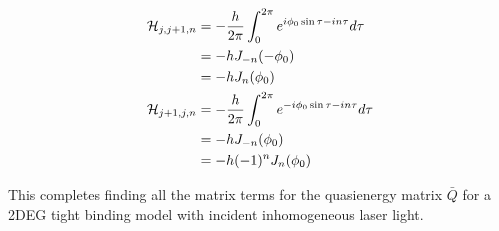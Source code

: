 \begin{align}
  \mathcal{H}_{j,j+1,n} &= -\dfrac{h}{2\pi} \int_0^{2\pi} e^{i \phi_0 \sin \tau - in\tau} d\tau \nonumber \\
  &= -h J_{-n}(-\phi_0) \nonumber \\
  &= -h J_n(\phi_0) \\
  \mathcal{H}_{j+1,j,n} &= -\dfrac{h}{2\pi} \int_0^{2\pi} e^{-i \phi_0 \sin \tau - in\tau} d\tau \nonumber \\
    &= -h J_{-n}(\phi_0) \nonumber \\
    &= -h (-1)^n J_n(\phi_0)
\end{align}

This completes finding all the matrix terms for the quasienergy matrix $\bar{Q}$ for a 2DEG tight binding model with incident inhomogeneous laser light.



